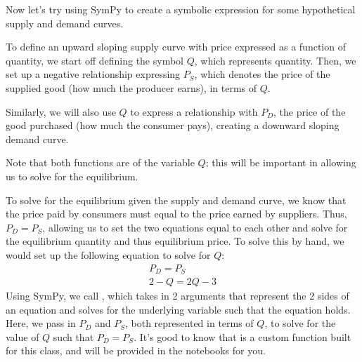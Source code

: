 \documentclass[letterpaper,10pt,english]{jupyterBook}
\begin{document}
\noindent{}

\sphinxAtStartPar
Now let’s try using SymPy to create a symbolic expression for some hypothetical supply and demand curves.

\sphinxAtStartPar
To define an upward sloping supply curve with price expressed as a function of quantity, we start off defining the symbol \(Q\), which represents quantity. Then, we set up a negative relationship expressing \(P_S\), which denotes the price of the supplied good (how much the producer earns), in terms of \(Q\).

\begin{sphinxVerbatim}[commandchars=\\\{\}]
  
      
\end{sphinxVerbatim}

\noindent{}

\sphinxAtStartPar
Similarly, we will also use \(Q\) to express a relationship with \(P_D\), the price of the good purchased (how much the consumer pays), creating a downward sloping demand curve.

\sphinxAtStartPar
Note that both functions are of the variable \(Q\); this will be important in allowing us to solve for the equilibrium.

\begin{sphinxVerbatim}[commandchars=\\\{\}]
    
\end{sphinxVerbatim}

\noindent{}

\sphinxAtStartPar
To solve for the equilibrium given the supply and demand curve, we know that the price paid by consumers must equal to the price earned by suppliers. Thus, \(P_D = P_S\), allowing us to set the two equations equal to each other and solve for the equilibrium quantity and thus equilibrium price. To solve this by hand, we would set up the following equation to solve for \(Q\):
\begin{equation*}
\begin{split}
P_D = P_S\\
2-Q = 2Q-3
\end{split}
\end{equation*}
\sphinxAtStartPar
Using SymPy, we call , which takes in 2 arguments that represent the 2 sides of an equation and solves for the underlying variable such that the equation holds. Here, we pass in \(P_D\) and \(P_S\), both represented in terms of \(Q\), to solve for the value of \(Q\) such that \(P_D=P_S\). It’s good to know that  is a custom function built for this class, and will be provided in the notebooks for you.
\end{document}
